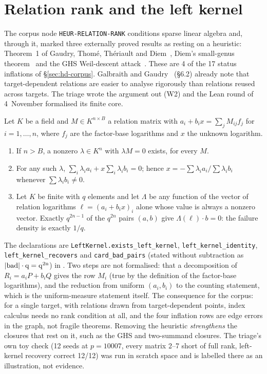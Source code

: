 \section{Relation rank and the left kernel}\label{sec:hd-rank}

The corpus node \texttt{HEUR-RELATION-RANK} conditions sparse linear algebra
and, through it, marked three externally proved results as resting on a
heuristic: Theorem~1 of Gaudry, Thomé, Thériault and
Diem~\cite{gtthd2007}, Diem's small-genus theorem~\cite{diem2006} and the
GHS Weil-descent attack~\cite{ghs2002}. These are 4 of the 17 status
inflations of \S\ref{sec:hd-corpus}. Galbraith and Gaudry~\cite{galbraith2016}
(\S6.2) already note that target-dependent relations are easier to analyse
rigorously than relations reused across targets. The triage wrote the
argument out (W2) and the Lean round of 4~November formalised its finite core.

\begin{theorem}\label{thm:hd-leftkernel}
Let $K$ be a field and $M\in K^{n\times B}$ a relation matrix with
$a_i+b_ix=\sum_jM_{ij}f_j$ for $i=1,\ldots,n$, where $f_j$ are the
factor-base logarithms and $x$ the unknown logarithm.
\begin{enumerate}
\item If $n>B$, a nonzero $\lambda\in K^n$ with $\lambda M=0$ exists, for
  every $M$.
\item For any such $\lambda$,
  $\sum_i\lambda_ia_i+x\sum_i\lambda_ib_i=0$; hence
  $x=-\sum\lambda_ia_i/\sum\lambda_ib_i$ whenever $\sum\lambda_ib_i\ne0$.
\item Let $K$ be finite with $q$ elements and let $\Lambda$ be any
  function of the vector of relation logarithms $\ell=(a_i+b_ix)_i$ alone
  whose value is always a nonzero vector. Exactly $q^{2n-1}$ of the $q^{2n}$ pairs
  $(a,b)$ give $\Lambda(\ell)\cdot b=0$: the failure density is exactly $1/q$.
\end{enumerate}
\end{theorem}

The declarations are \texttt{LeftKernel.exists\_left\_kernel},
\texttt{left\_kernel\_identity}, \texttt{left\_kernel\_recovers} and
\texttt{card\_bad\_pairs} (stated without subtraction as
$\lvert \rm bad \rvert\cdot q=q^{2n}$) in
. Two steps
are not formalised: that a decomposition of $R_i=a_iP+b_iQ$ gives the row
$M_i$ (true by the definition of the factor-base logarithms), and the
reduction from uniform $(a_i,b_i)$ to the counting statement, which is the
uniform-measure statement itself. The consequence for the corpus: for a
single target, with relations drawn from target-dependent points, index
calculus needs no rank condition at all, and the four inflation rows are edge
errors in the graph, not fragile theorems. Removing the heuristic
\emph{strengthens} the closures that rest on it, such as the GHS and
two-summand closures. The triage's own toy check (12 seeds at $p=10007$,
every matrix 2--7 short of full rank, left-kernel recovery correct 12/12) was
run in scratch space and is labelled there as an illustration, not evidence.

